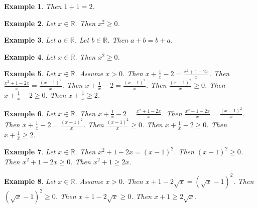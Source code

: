 \documentclass[12pt]{article}
\newtheorem{example}{Example}
\begin{document}

\begin{example}
    Then $1+1=2$.
\end{example}

\begin{example}
    Let $x\in\mathbb{R}$. Then $x^2\ge 0$.
\end{example}

\begin{example}
    Let $a\in\mathbb{R}$. Let $b\in\mathbb{R}$. Then $a+b=b+a$.
\end{example}

\begin{example}
    Let $x\in\mathbb{R}$. Then $x^2 \ge 0$.
\end{example}

\begin{example}
    Let $x\in\mathbb{R}$. Assume $x>0$. Then $x + \frac{1}{x} - 2 = \frac{x^2 + 1 - 2x}{x}$.
    Then $\frac{x^2 + 1 - 2x}{x} = \frac{{(x-1)}^2}{x}$.
    Then $x + \frac{1}{x} - 2 = \frac{{(x-1)}^2}{x}$.
    Then $\frac{{(x-1)}^2}{x} \ge 0$.
    Then $x + \frac{1}{x} - 2 \ge 0$.
    Then $x + \frac{1}{x} \ge 2$.
\end{example}
\begin{example}
    Let $x\in\mathbb{R}$. Then $x + \frac{1}{x} - 2 = \frac{x^2 + 1 - 2x}{x}$.
    Then $\frac{x^2 + 1 - 2x}{x} = \frac{{(x-1)}^2}{x}$.
    Then $x + \frac{1}{x} - 2 = \frac{{(x-1)}^2}{x}$.
    Then $\frac{{(x-1)}^2}{x} \ge 0$.
    Then $x + \frac{1}{x} - 2 \ge 0$.
    Then $x + \frac{1}{x} \ge 2$.
\end{example}



\begin{example}
    Let $x\in\mathbb{R}$. Then $x^2 + 1 - 2x = {(x-1)}^2$. Then ${(x-1)}^2 \ge 0$. Then $x^2 + 1 - 2x \ge 0$. Then $x^2 + 1 \ge 2x$.
\end{example}

\begin{example}
    Let $x\in\mathbb{R}$. Assume $x > 0$. Then $x + 1 - 2\sqrt{x} = {(\sqrt{x}-1)}^2$. Then ${(\sqrt{x}-1)}^2 \ge 0$. Then $x + 1 - 2\sqrt{x} \ge 0$. Then $x + 1 \ge 2\sqrt{x}$.
\end{example}
\end{document}
